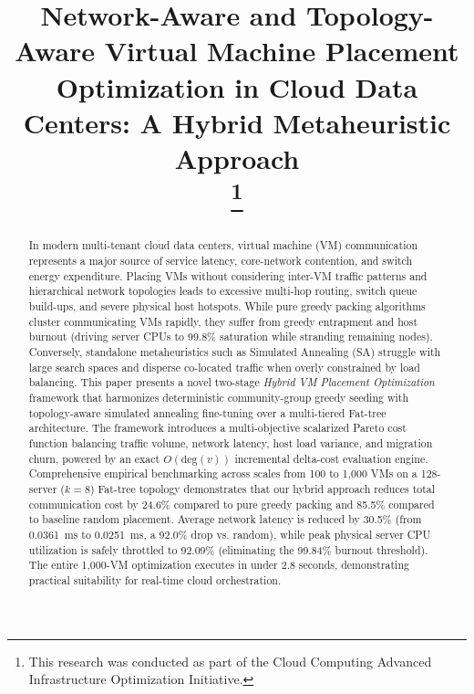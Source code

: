 \documentclass[conference]{IEEEtran}
\begin{document}
\title{Network-Aware and Topology-Aware Virtual Machine Placement Optimization in Cloud Data Centers: A Hybrid Metaheuristic Approach\\
\thanks{This research was conducted as part of the Cloud Computing Advanced Infrastructure Optimization Initiative.}
}

\author{
}

\maketitle

\begin{abstract}
In modern multi-tenant cloud data centers, virtual machine (VM) communication represents a major source of service latency, core-network contention, and switch energy expenditure. Placing VMs without considering inter-VM traffic patterns and hierarchical network topologies leads to excessive multi-hop routing, switch queue build-ups, and severe physical host hotspots. While pure greedy packing algorithms cluster communicating VMs rapidly, they suffer from greedy entrapment and host burnout (driving server CPUs to 99.8\% saturation while stranding remaining nodes). Conversely, standalone metaheuristics such as Simulated Annealing (SA) struggle with large search spaces and disperse co-located traffic when overly constrained by load balancing. This paper presents a novel two-stage \emph{Hybrid VM Placement Optimization} framework that harmonizes deterministic community-group greedy seeding with topology-aware simulated annealing fine-tuning over a multi-tiered Fat-tree architecture. The framework introduces a multi-objective scalarized Pareto cost function balancing traffic volume, network latency, host load variance, and migration churn, powered by an exact $O(\mathrm{deg}(v))$ incremental delta-cost evaluation engine. Comprehensive empirical benchmarking across scales from 100 to 1,000 VMs on a 128-server ($k=8$) Fat-tree topology demonstrates that our hybrid approach reduces total communication cost by 24.6\% compared to pure greedy packing and 85.5\% compared to baseline random placement. Average network latency is reduced by 30.5\% (from 0.0361~ms to 0.0251~ms, a 92.0\% drop vs. random), while peak physical server CPU utilization is safely throttled to 92.09\% (eliminating the 99.84\% burnout threshold). The entire 1,000-VM optimization executes in under 2.8 seconds, demonstrating practical suitability for real-time cloud orchestration.
\end{abstract}
\end{document}

